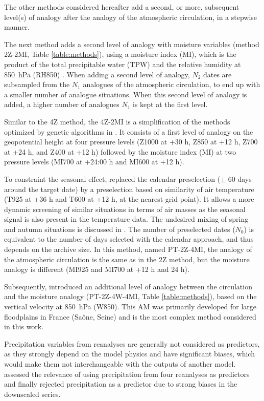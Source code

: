 \documentclass{ametsoc}
\begin{document}
	The other methods considered hereafter add a second, or more, subsequent level(s) of analogy after the analogy of the atmospheric circulation, in a stepwise manner.
	
	The next method adds a second level of analogy with moisture variables (method 2Z-2MI, Table \ref{table:methods}), using a moisture index (MI), which is the product of the total precipitable water (TPW) and the relative humidity at 850~hPa (RH850) \citep{Bontron2004}. When adding a second level of analogy, $N_{2}$ dates are subsampled from the $N_{1}$ analogues of the atmospheric circulation, to end up with a smaller number of analogue situations. When this second level of analogy is added, a higher number of analogues $N_{1}$ is kept at the first level. 
	
	Similar to the 4Z method, the 4Z-2MI is a simplification of the methods optimized by genetic algorithms in \citet{Horton2017b}. It consists of a first level of analogy on the geopotential height at four pressure levels (Z1000 at +30 h, Z850 at +12 h, Z700 at +24 h, and Z400 at +12 h) followed by the moisture index (MI) at two pressure levels (MI700 at +24:00 h and MI600 at +12 h).
	
	To constraint the seasonal effect, \citet{BenDaoud2016} replaced the calendar preselection ($\pm$ 60 days around the target date) by a preselection based on similarity of air temperature (T925 at +36 h and T600 at +12 h, at the nearest grid point). It allows a more dynamic screening of similar situations in terms of air masses as the seasonal signal is also present in the temperature data. The undesired mixing of spring and autumn situations is discussed in \citet{Caillouet2016}. The number of preselected dates ($N_{0}$) is equivalent to the number of days selected with the calendar approach, and thus depends on the archive size. In this method, named PT-2Z-4MI, the analogy of the atmospheric circulation is the same as in the 2Z method, but the moisture analogy is different (MI925 and MI700 at +12 h and 24 h).
	
	Subsequently, \citet{BenDaoud2016} introduced an additional level of analogy between the circulation and the moisture analogy (PT-2Z-4W-4MI, Table \ref{table:methods}), based on the vertical velocity at 850~hPa (W850). This AM was primarily developed for large floodplains in France (Sa\^{o}ne, Seine) and is the most complex method considered in this work. 
	
	Precipitation variables from reanalyses are generally not considered as predictors, as they strongly depend on the model physics \citep{Rienecker2011} and have significant biases, which would make them not interchangeable with the outputs of another model. \citet{Dayon2015} assessed the relevance of using precipitation from four reanalyses as predictors and finally rejected precipitation as a predictor due to strong biases in the downscaled series.
	
\end{document}
